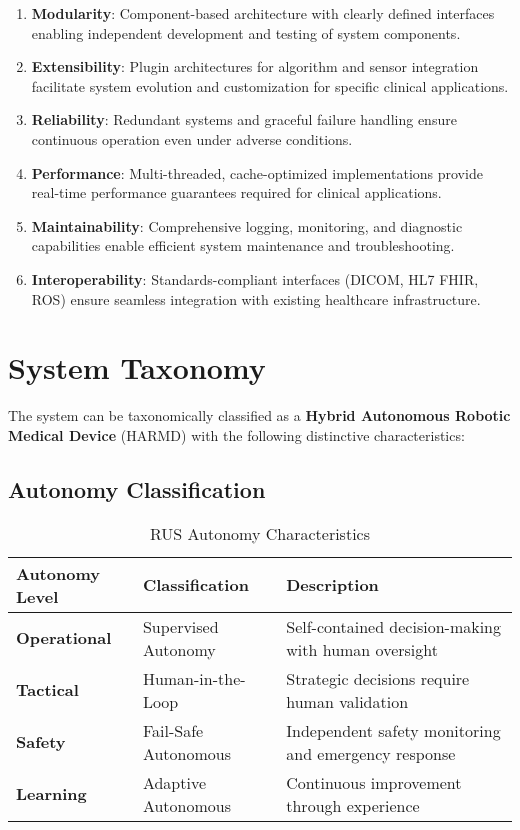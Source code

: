 \begin{enumerate}
    \item \textbf{Modularity}: Component-based architecture with clearly defined interfaces enabling independent development and testing of system components.
    
    \item \textbf{Extensibility}: Plugin architectures for algorithm and sensor integration facilitate system evolution and customization for specific clinical applications.
    
    \item \textbf{Reliability}: Redundant systems and graceful failure handling ensure continuous operation even under adverse conditions.
    
    \item \textbf{Performance}: Multi-threaded, cache-optimized implementations provide real-time performance guarantees required for clinical applications.
    
    \item \textbf{Maintainability}: Comprehensive logging, monitoring, and diagnostic capabilities enable efficient system maintenance and troubleshooting.
    
    \item \textbf{Interoperability}: Standards-compliant interfaces (DICOM, HL7 FHIR, ROS) ensure seamless integration with existing healthcare infrastructure.
\end{enumerate}

\section{System Taxonomy}
\label{sec:system_taxonomy}

The \rus{} system can be taxonomically classified as a \textbf{Hybrid Autonomous Robotic Medical Device} (\textsc{HARMD}) with the following distinctive characteristics:

\subsection{Autonomy Classification}

\begin{table}[H]
\centering
\caption{RUS Autonomy Characteristics}
\label{tab:autonomy_classification}
\begin{tabular}{@{}p{3cm}p{4cm}p{6cm}@{}}
\toprule
\textbf{Autonomy Level} & \textbf{Classification} & \textbf{Description} \\
\midrule
\textbf{Operational} & Supervised Autonomy & Self-contained decision-making with human oversight \\
\textbf{Tactical} & Human-in-the-Loop & Strategic decisions require human validation \\
\textbf{Safety} & Fail-Safe Autonomous & Independent safety monitoring and emergency response \\
\textbf{Learning} & Adaptive Autonomous & Continuous improvement through experience \\
\bottomrule
\end{tabular}
\end{table}

